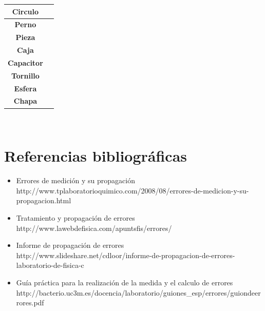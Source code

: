 \documentclass[letter,11pt]{article}
\begin{document}
\begin{center}
\begin{tabular}{|c|>{\centering}m{5.0cm}<{\centering}|}
\hline
\textbf{Circulo} & \tabularnewline \hline
\textbf{Perno} & \tabularnewline \hline
\textbf{Pieza} & \tabularnewline \hline
\textbf{Caja} & \tabularnewline \hline
\textbf{Capacitor} & \tabularnewline \hline
\textbf{Tornillo} & \tabularnewline \hline
\textbf{Esfera} & \tabularnewline \hline
\textbf{Chapa} & \tabularnewline \hline
\end{tabular}\\
\end{center}

\section{Referencias bibliográficas}
\begin{itemize}
\item Errores de medición y su propagación \\
http://www.tplaboratorioquimico.com/2008/08/errores-de-medicion-y-su-propagacion.html
\item Tratamiento y propagación de errores \\
http://www.lawebdefisica.com/apuntsfis/errores/
\item Informe de propagación de errores \\
http://www.slideshare.net/cdloor/informe-de-propagacion-de-errores-laboratorio-de-fisica-c
\item Guía práctica para la realización de la medida y el calculo de errores \\
http://bacterio.uc3m.es/docencia/laboratorio/guiones\_esp/errores/guiondeerrores.pdf
\end{itemize}
\end{document}
